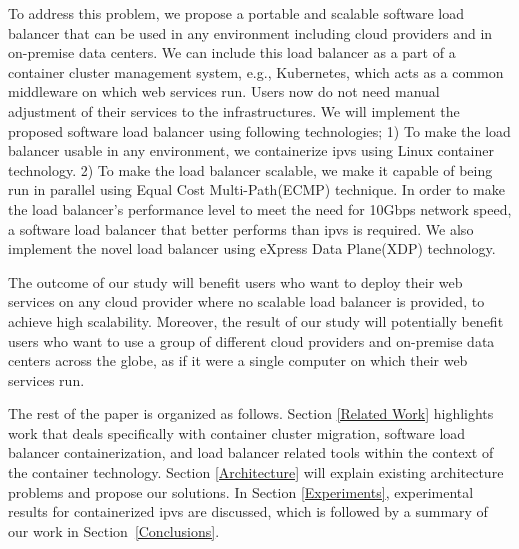 To address this problem, we propose a portable and scalable software load balancer that can be used in any environment including cloud providers and in on-premise data centers.
We can include this load balancer as a part of a container cluster management system, e.g., Kubernetes\cite{K8s2017}, which acts as a common middleware on which web services run.
Users now do not need manual adjustment of their services to the infrastructures.
We will implement the proposed software load balancer using following technologies;
1) To make the load balancer usable in any environment, we containerize ipvs\cite{Zhang2000} using Linux container technology\cite{menage2007adding}.
2) To make the load balancer scalable, we make it capable of being run in parallel using Equal Cost Multi-Path(ECMP) technique\cite{al2008scalable}.
In order to make the load balancer's performance level to meet the need for 10Gbps network speed, a software load balancer that better performs than ipvs is required.
We also implement the novel load balancer using eXpress Data Plane(XDP) technology\cite{bertin2017xdp}.

The outcome of our study will benefit users who want to deploy their web services on any cloud provider where no scalable load balancer is provided, to achieve high scalability.
Moreover, the result of our study will potentially benefit users who want to use a group of different cloud providers and on-premise data centers across the globe, as if it were a single computer on which their web services run.

The rest of the paper is organized as follows.
Section \ref{Related Work} highlights work that deals specifically with container cluster migration, 
software load balancer containerization, and load balancer related tools within the context of the container technology. 
Section \ref{Architecture} will explain existing architecture problems and propose our solutions.
In Section \ref{Experiments}, experimental results for containerized ipvs are discussed,  
which is followed by a summary of our work in Section~\ref{Conclusions}.

